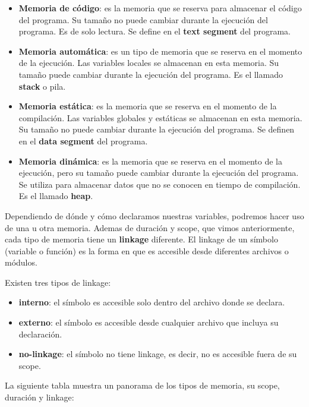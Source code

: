 \documentclass[]{scrartcl}
\begin{document}
\begin{itemize}
  \item \textbf{Memoria de código}: es la memoria que se reserva para almacenar el código del programa. Su tamaño no puede cambiar durante la ejecución del programa. Es de solo lectura. Se define en el \textbf{text segment} del programa.
  \item \textbf{Memoria automática}: es un tipo de memoria que se reserva en el momento de la ejecución. Las variables locales se almacenan en esta memoria. Su tamaño puede cambiar durante la ejecución del programa. Es el llamado \textbf{stack} o pila.
    \item \textbf{Memoria estática}: es la memoria que se reserva en el momento de la compilación. Las variables globales y estáticas se almacenan en esta memoria. Su tamaño no puede cambiar durante la ejecución del programa. Se definen en el \textbf{data segment} del programa.
    \item \textbf{Memoria dinámica}: es la memoria que se reserva en el momento de la ejecución, pero su tamaño puede cambiar durante la ejecución del programa. Se utiliza para almacenar datos que no se conocen en tiempo de compilación. Es el llamado \textbf{heap}.
  \end{itemize}
  
Dependiendo de dónde y cómo declaramos nuestras variables, podremos hacer uso de una u otra memoria. Ademas de duración y scope, que vimos anteriormente, cada tipo de memoria tiene un \textbf{linkage} diferente. El linkage de un símbolo (variable o función) es la forma en que es  accesible desde diferentes archivos o módulos. 

Existen tres tipos de linkage:
\begin{itemize}
  \item \textbf{interno}: el símbolo es accesible solo dentro del archivo donde se declara.
  \item \textbf{externo}: el símbolo es accesible desde cualquier archivo que incluya su declaración.
  \item \textbf{no-linkage}: el símbolo no tiene linkage, es decir, no es accesible fuera de su scope.
\end{itemize}

La siguiente tabla muestra un panorama de los tipos de memoria, su scope, duración y linkage:
\end{document}
